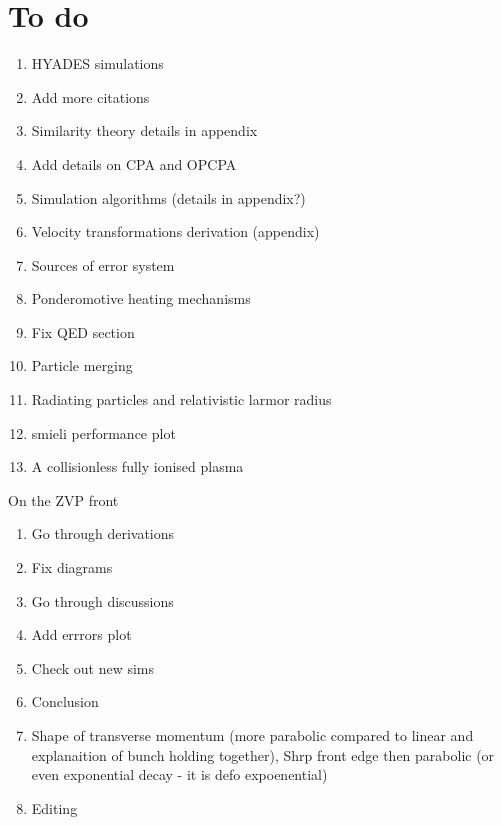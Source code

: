 \section{To do}

\begin{enumerate}
	\item HYADES simulations
	\item Add more citations
	\item Similarity theory details in appendix
	\item Add details on CPA and OPCPA
	\item Simulation algorithms (details in appendix?)
	\item Velocity transformations derivation (appendix)
	\item Sources of error system
	\item Ponderomotive heating mechanisms
	\item Fix QED section
	\item Particle merging
	\item Radiating particles and relativistic larmor radius
	\item smieli performance plot
	\item A collisionless fully ionised plasma
\end{enumerate}

On the ZVP front
\begin{enumerate}
	\item Go through derivations
	\item Fix diagrams
	\item Go through discussions
	\item Add errrors plot
	\item Check out new sims
	\item Conclusion
	\item Shape of transverse momentum (more parabolic compared to linear and explanaition of bunch holding together), Shrp front edge then parabolic (or even exponential decay - it is defo expoenential)
	\item Editing
\end{enumerate}



